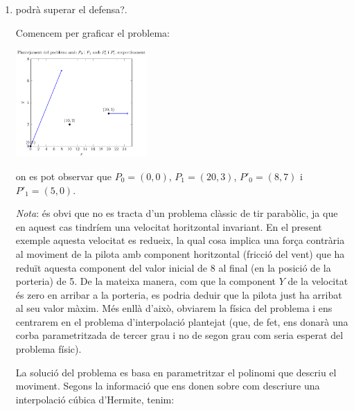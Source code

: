 \begin{enumerate}
  \item podrà superar el defensa?.
  

  Comencem per graficar el problema:

\begin{center}
  \includegraphics[width=5cm]{../figures/interpolaciohermite2inicial.pdf}
\end{center}

on es pot observar que $P_0=(0,0)$, $P_1=(20,3)$, $P'_0=(8,7)$ i $P'_1=(5,0)$.

{\em Nota}: és obvi que no es tracta d'un problema clàssic de tir parabòlic, ja que en aquest cas tindríem una velocitat horitzontal invariant. En el present exemple aquesta velocitat es redueix, la qual cosa implica una força contrària al moviment de la pilota amb component horitzontal (fricció del vent) que ha reduït aquesta component del valor inicial de 8 al final (en la posició de la porteria) de 5. De la mateixa manera, com que la component $Y$ de la velocitat és zero en arribar a la porteria, es podria deduir que la pilota just ha arribat al seu valor màxim. Més enllà d'això, obviarem la física del problema i ens centrarem en el problema d'interpolació plantejat (que, de fet, ens donarà una corba parametritzada de tercer grau i no de segon grau com seria esperat del problema físic).

La solució del problema es basa en parametritzar el polinomi que descriu el moviment. Segons la informació que ens donen sobre com descriure una interpolació cúbica d'Hermite, tenim:


\end{enumerate}
